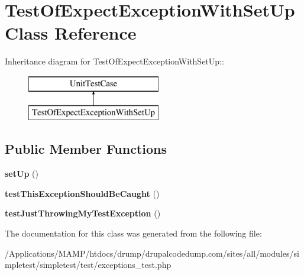 \hypertarget{class_test_of_expect_exception_with_set_up}{
\section{TestOfExpectExceptionWithSetUp Class Reference}
\label{class_test_of_expect_exception_with_set_up}
}
Inheritance diagram for TestOfExpectExceptionWithSetUp::\begin{figure}[H]
\begin{center}
\leavevmode
\includegraphics[height=2cm]{class_test_of_expect_exception_with_set_up}
\end{center}
\end{figure}
\subsection*{Public Member Functions}
\begin{DoxyCompactItemize}
\item 
\hypertarget{class_test_of_expect_exception_with_set_up_acb499c7d2105693468a5415ba4c6da07}{
{\bfseries setUp} ()}
\label{class_test_of_expect_exception_with_set_up_acb499c7d2105693468a5415ba4c6da07}

\item 
\hypertarget{class_test_of_expect_exception_with_set_up_ae80f540df2fcd5132dc1990da7144aca}{
{\bfseries testThisExceptionShouldBeCaught} ()}
\label{class_test_of_expect_exception_with_set_up_ae80f540df2fcd5132dc1990da7144aca}

\item 
\hypertarget{class_test_of_expect_exception_with_set_up_a1f9ae2e8024802f9e207449217b89f0e}{
{\bfseries testJustThrowingMyTestException} ()}
\label{class_test_of_expect_exception_with_set_up_a1f9ae2e8024802f9e207449217b89f0e}

\end{DoxyCompactItemize}


The documentation for this class was generated from the following file:\begin{DoxyCompactItemize}
\item 
/Applications/MAMP/htdocs/drump/drupalcodedump.com/sites/all/modules/simpletest/simpletest/test/exceptions\_\-test.php\end{DoxyCompactItemize}

